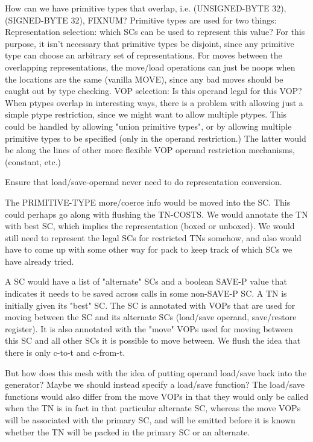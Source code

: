 How can we have primitive types that overlap, i.e. (UNSIGNED-BYTE 32),
(SIGNED-BYTE 32), FIXNUM?
Primitive types are used for two things:
    Representation selection: which SCs can be used to represent this value?
	For this purpose, it isn't necessary that primitive types be disjoint,
	since any primitive type can choose an arbitrary set of
	representations.  For moves between the overlapping representations,
	the move/load operations can just be noops when the locations are the
	same (vanilla MOVE), since any bad moves should be caught out by type
	checking.
    VOP selection:
	Is this operand legal for this VOP?  When ptypes overlap in interesting
	ways, there is a problem with allowing just a simple ptype restriction,
	since we might want to allow multiple ptypes.  This could be handled
	by allowing "union primitive types", or by allowing multiple primitive
	types to be specified (only in the operand restriction.)  The latter
	would be along the lines of other more flexible VOP operand restriction
	mechanisms, (constant, etc.)



Ensure that load/save-operand never need to do representation conversion.

The PRIMITIVE-TYPE more/coerce info would be moved into the SC.  This could
perhaps go along with flushing the TN-COSTS.  We would annotate the TN with
best SC, which implies the representation (boxed or unboxed).  We would still
need to represent the legal SCs for restricted TNs somehow, and also would have to
come up with some other way for pack to keep track of which SCs we have already
tried.

A SC would have a list of "alternate" SCs and a boolean SAVE-P value that
indicates it needs to be saved across calls in some non-SAVE-P SC.  A TN is
initially given its "best" SC.  The SC is annotated with VOPs that are used for
moving between the SC and its alternate SCs (load/save operand, save/restore
register).  It is also annotated with the "move" VOPs used for moving between
this SC and all other SCs it is possible to move between.  We flush the idea
that there is only c-to-t and c-from-t.

But how does this mesh with the idea of putting operand load/save back into the
generator?  Maybe we should instead specify a load/save function?  The
load/save functions would also differ from the move VOPs in that they would
only be called when the TN is in fact in that particular alternate SC, whereas
the move VOPs will be associated with the primary SC, and will be emitted
before it is known whether the TN will be packed in the primary SC or an
alternate.

